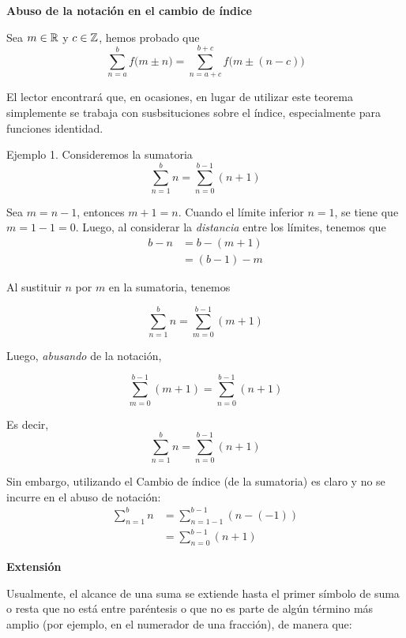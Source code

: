 \textbf{Abuso de la notación en el cambio de índice}

Sea $m\in \mathbb{R}$ y $c\in \mathbb{Z}$, hemos probado que \[\sum_{n=a}^{b}f\bigl(m\pm n\bigr) = \sum_{n=a+c}^{b+c}f\bigl(m\pm (n- c)\bigr)\]

El lector encontrará que, en ocasiones, en lugar de utilizar este teorema simplemente se trabaja con susbsituciones sobre el índice, especialmente para funciones identidad. 

Ejemplo 1. Consideremos la sumatoria
  \[\sum_{n=1}^{b} n = \sum_{n=0}^{b-1} (n+1)\]
  
  Sea $m=n-1$, entonces $m+1=n$. Cuando el límite inferior $n=1$, se tiene que $m=1-1=0$. Luego, al considerar la \textit{distancia} entre los límites, tenemos que
  \begin{align*}
    b - n &= b - (m+1)\\
    &= (b-1) - m
  \end{align*}
  
  Al sustituir $n$ por $m$ en la sumatoria, tenemos
  
  \[\sum_{n=1}^{b} n = \sum_{m=0}^{b-1} (m+1)\]
  
  Luego, \textit{abusando} de la notación, 
  
  \[\sum_{m=0}^{b-1} (m+1) = \sum_{n=0}^{b-1} (n+1)\]
  
  Es decir, \[\sum_{n=1}^{b} n = \sum_{n=0}^{b-1} (n+1)\]
  
  Sin embargo, utilizando el Cambio de índice (de la sumatoria) es claro y no se incurre en el abuso de notación:
  \begin{align*}
    \sum_{n=1}^{b} n &= \sum_{n=1-1}^{b-1} (n-(-1))\\
    &= \sum_{n=0}^{b-1} (n+1)
  \end{align*}
  
  

\textbf{Extensión}

Usualmente, el alcance de una suma se extiende hasta el primer símbolo de suma o resta que no está entre paréntesis o que no es parte de algún término más amplio (por ejemplo, en el numerador de una fracción), de manera que:

